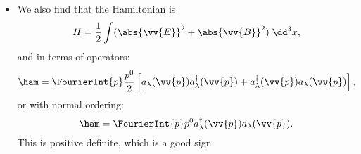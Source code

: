 \begin{itemize}
\begin{equation}
        \end{equation}
    \item We also find that the Hamiltonian is 
        \begin{equation}
            H = \frac{1}{2}\int (\abs{\vv{E}}^2 + \abs{\vv{B}}^2)\;\dd^3x,
        \end{equation}
        and in terms of operators:
        \begin{equation*}
            \ham = \FourierInt{p} \frac{p^0}{2} \left[ a_{\lambda}(\vv{p})a_{\lambda}^{\dagger}(\vv{p}) + a_{\lambda}^{\dagger}(\vv{p})a_{\lambda}(\vv{p}) \right],
        \end{equation*}
        or with normal ordering:
        \begin{equation}
            \ham = \FourierInt{p} p^0  a_{\lambda}^{\dagger}(\vv{p})a_{\lambda}(\vv{p}).
        \end{equation}
        This is positive definite, which is a good sign.
\end{itemize}




